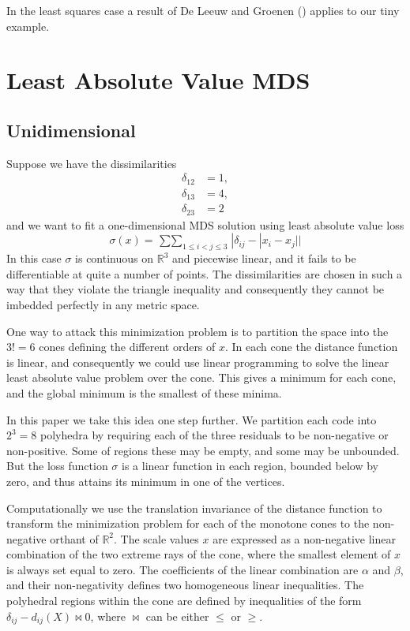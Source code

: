 \documentclass[
  12pt,
  letterpaper,
  DIV=11,
  numbers=noendperiod]{scrartcl}
\begin{document}
In the least squares case a result of De Leeuw and Groenen
() applies to our tiny example.

\section{Least Absolute Value MDS}\label{least-absolute-value-mds}

\subsection{Unidimensional}\label{unidimensional-1}

Suppose we have the dissimilarities \begin{align*}
\delta_{12}&=1,\\
\delta_{13}&=4,\\
\delta_{23}&=2
\end{align*} and we want to fit a one-dimensional MDS solution using
least absolute value loss \begin{equation*}
\sigma(x)=\mathop{\sum\sum}_{1\leq i<j\leq 3} |\delta_{ij}-|x_i-x_j||
\end{equation*} In this case \(\sigma\) is continuous on
\(\mathbb{R}^3\) and piecewise linear, and it fails to be differentiable
at quite a number of points. The dissimilarities are chosen in such a
way that they violate the triangle inequality and consequently they
cannot be imbedded perfectly in any metric space.

One way to attack this minimization problem is to partition the space
into the \(3!=6\) cones defining the different orders of \(x\). In each
cone the distance function is linear, and consequently we could use
linear programming to solve the linear least absolute value problem over
the cone. This gives a minimum for each cone, and the global minimum is
the smallest of these minima.

In this paper we take this idea one step further. We partition each code
into \(2^3=8\) polyhedra by requiring each of the three residuals to be
non-negative or non-positive. Some of regions these may be empty, and
some may be unbounded. But the loss function \(\sigma\) is a linear
function in each region, bounded below by zero, and thus attains its
minimum in one of the vertices.

Computationally we use the translation invariance of the distance
function to transform the minimization problem for each of the monotone
cones to the non-negative orthant of \(\mathbb{R}^2\). The scale values
\(x\) are expressed as a non-negative linear combination of the two
extreme rays of the cone, where the smallest element of \(x\) is always
set equal to zero. The coefficients of the linear combination are
\(\alpha\) and \(\beta\), and their non-negativity defines two
homogeneous linear inequalities. The polyhedral regions within the cone
are defined by inequalities of the form
\(\delta_{ij}-d_{ij}(X)\bowtie 0\), where \(\bowtie\) can be either
\(\leq\) or \(\geq\).
\end{document}
